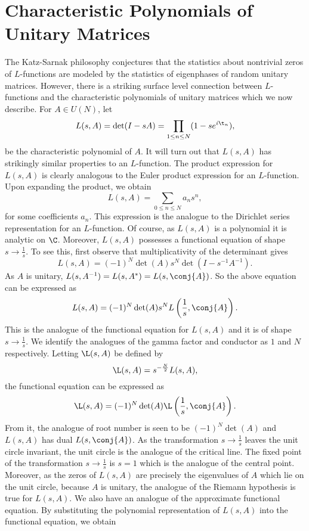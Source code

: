   \section{Characteristic Polynomials of Unitary Matrices}
    The Katz-Sarnak philosophy conjectures that the statistics about nontrivial zeros of $L$-functions are modeled by the statistics of eigenphases of random unitary matrices. However, there is a striking surface level connection between $L$-functions and the characteristic polynomials of unitary matrices which we now describe. For $A \in U(N)$, let
    \[
      L(s,A) = \det(I-sA) = \prod_{1 \le n \le N}(1-se^{i\t_{n}}),
    \]
    be the characteristic polynomial of $A$. It will turn out that $L(s,A)$ has strikingly similar properties to an $L$-function. The product expression for $L(s,A)$ is clearly analogous to the Euler product expression for an $L$-function. Upon expanding the product, we obtain
    \[
      L(s,A) = \sum_{0 \le n \le N}a_{n}s^{n},
    \]
    for some coefficients $a_{n}$. This expression is the analogue to the Dirichlet series representation for an $L$-function. Of course, as $L(s,A)$ is a polynomial it is analytic on $\C$. Moreover, $L(s,A)$ possesses a functional equation of shape $s \to \frac{1}{s}$. To see this, first observe that multiplicativity of the determinant gives
    \[
      L(s,A) = (-1)^{N}\det(A)s^{N}\det(I-s^{-1}A^{-1}).
    \]
    As $A$ is unitary, $L(s,A^{-1}) = L(s,A^{\ast}) = L(s,\conj{A})$. So the above equation can be expressed as
    \[
      L(s,A) = (-1)^{N}\det(A)s^{N}L\left(\frac{1}{s},\conj{A}\right).
    \]
    This is the analogue of the functional equation for $L(s,A)$ and it is of shape $s \to \frac{1}{s}$. We identify the analogues of the gamma factor and conductor as $1$ and $N$ respectively. Letting $\L(s,A)$ be defined by
    \[
      \L(s,A) = s^{-\frac{N}{2}}L(s,A),
    \]
    the functional equation can be expressed as
    \[
        \L(s,A) = (-1)^{N}\det(A) \L\left(\frac{1}{s},\conj{A}\right).
    \]
    From it, the analogue of root number is seen to be $(-1)^{N}\det(A)$ and $L(s,A)$ has dual $L(s,\conj{A})$. As the transformation $s \to \frac{1}{s}$ leaves the unit circle invariant, the unit circle is the analogue of the critical line. The fixed point of the transformation $s \to \frac{1}{s}$ is $s = 1$ which is the analogue of the central point. Moreover, as the zeros of $L(s,A)$ are precisely the eigenvalues of $A$ which lie on the unit circle, because $A$ is unitary, the analogue of the Riemann hypothesis is true for $L(s,A)$. We also have an analogue of the approximate functional equation. By substituting the polynomial representation of $L(s,A)$ into the functional equation, we obtain
